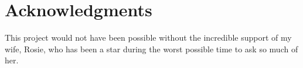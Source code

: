 \newpage
\vspace*{\fill}
\section*{Acknowledgments}


This project would not have been possible without the incredible support of my wife, Rosie, who has been a star during the worst possible time to ask so much of her.

\vspace*{\fill}
